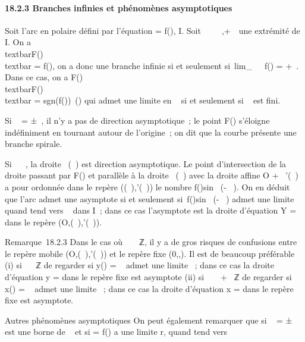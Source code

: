 \documentclass[]{article}
\begin{document}
\paragraph{18.2.3 Branches infinies et phénomènes asymptotiques}

Soit \Gamma l'arc en polaire défini par l'équation \rho = f(\theta), \theta \in I. Soit \alpha~ \in
{}~ \cup\-\infty~,+\infty~\ une extrémité de I. On a
\\textbar{}F(\theta)\\textbar{} =
\textbar{}f(\theta)\textbar{}, on a donc une branche infinie si et seulement
si~lim\_\theta\rightarrow~\alpha~~\textbar{}f(\theta)\textbar{} =
+\infty~. Dans ce cas, on a  F(\theta) \over
\\textbar{}F(\theta)\\textbar{}
= sgn(f(\theta))\vecu~(\theta) qui
admet une limite en \alpha~ si et seulement si \alpha~ est fini.

Si \alpha~ = ±\infty~, il n'y a pas de direction asymptotique~; le point F(\theta)
s'éloigne indéfiniment en tournant autour de l'origine~; on dit que la
courbe présente une branche spirale.

Si \alpha~ \in {}~, la droite ~\vecu(\alpha~) est direction
asymptotique. Le point d'intersection de la droite passant par F(\theta) et
parallèle à la droite ~\vecu(\alpha~) avec la droite affine
O + ~\vecu'(\alpha~) a pour ordonnée dans le repère
(\vecu(\alpha~),\vecu'(\alpha~)) le nombre
f(\theta)sin~ (\theta - \alpha~). On en déduit que l'arc admet
une asymptote si et seulement si~f(\theta)sin~ (\theta -
\alpha~) admet une limite \ell quand \theta tend vers \alpha~ dans I~; dans ce cas
l'asymptote est la droite d'équation Y = \ell dans le repère
(O,\vecu(\alpha~),\vecu'(\alpha~)).

Remarque~18.2.3 Dans le cas où \alpha~ \in \pi~  ℤ, il y
a de gros risques de confusions entre le repère mobile
(O,\vecu(\alpha~),\vecu'(\alpha~)) et le
repère fixe (0,\vec\imath,). Il
est de beaucoup préférable (i) si \alpha~ \in \pi~ℤ de regarder si y(\theta) =
\rhosin~ \theta admet une limite \ell~; dans ce cas la
droite d'équation y = \ell dans le repère fixe est asymptote (ii) si \alpha~ \in
\pi~  + \pi~ℤ de regarder si x(\theta) =
\rhocos~ \theta admet une limite \ell~; dans ce cas la
droite d'équation x = \ell dans le repère fixe est asymptote.

Autres phénomènes asymptotiques On peut également remarquer que si \alpha~ =
±\infty~ est une borne de \alpha~ et si \rho = f(\theta) a une limite r, quand \theta tend vers \alpha~
\end{document}
